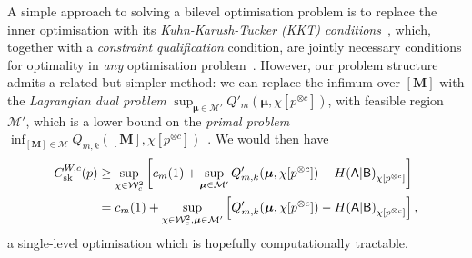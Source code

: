 \documentclass[10pt, a4paper]{article}
\numberwithin{equation}{section} %
\theoremstyle{definition}
\theoremstyle{plain}
\newcommand{\?}{\mathrel{?}} %
\newcommand{\cvec}[1]{\boldsymbol{\mathbf{#1}}}    %
\newcommand{\matr}[2][]{\left[\mathbf{#2}#1\right]} %
\newcommand{\sM}{\mathcal{M}}
\newcommand{\sW}{\mathcal{W}}
\newcommand{\crv}[1]{\mathsf{#1}}
\newcommand{\sk}{\rm sk}
\begin{document}
                      A simple approach to solving a bilevel optimisation problem is to replace the inner optimisation with its \emph{Kuhn-Karush-Tucker (KKT) conditions}~\cite{BilevelReview}, which, together with a \emph{constraint qualification} condition, are jointly necessary conditions for optimality in \emph{any} optimisation problem~\cite[Ch. 11.5]{LuenbergerYe}. However, our problem structure admits a related but simpler method: we can replace the infimum over \(\matr{M}\) with the \emph{Lagrangian dual problem} \(\sup_{\cvec{\mu} \in \sM'} Q'_m(\cvec{\mu}, \chi[p^{\otimes c}])\), with feasible region \(\sM'\), which is a lower bound on the \emph{primal problem} \(\inf_{\matr{M} \in \sM} Q_{m,k}(\matr{M}, \chi[p^{\otimes c}])\)~\cite[Ch. 5.9.1]{BoydVand}. We would then have
                      \begin{align}
                        C^{W,c}_{\sk}(p) &\geq \sup_{\chi\in\sW_c^2} \left[ c_m(1) + \sup_{\cvec{\mu} \in \sM'} Q_{m,k}'(\cvec{\mu}, \chi[p^{\otimes c}]) - H{(\crv{A}|\crv{B})}_{\chi[p^{\otimes c}]} \right] \\
                                         &= c_m(1) + \sup_{\chi\in\sW_c^2, \cvec{\mu} \in \sM'} \left[ Q_{m,k}'(\cvec{\mu}, \chi[p^{\otimes c}]) - H{(\crv{A}|\crv{B})}_{\chi[p^{\otimes c}]} \right],\label{eqn:wircap_dual}
                      \end{align}
                      a single-level optimisation which is hopefully computationally tractable.
\end{document}

